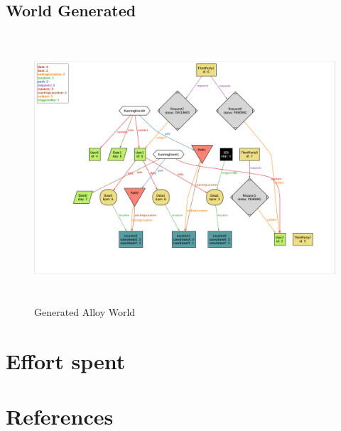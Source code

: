 \documentclass{article}
\begin{document}
\subsection{World Generated}
\begin{figure}[ht]
\centering
    \includegraphics[height=10cm,keepaspectratio, angle=270]{Figures/AlloyWorld}
    \caption{Generated Alloy World}
\end{figure}

\newpage
\section{Effort spent}

\section{References}
\end{document}
